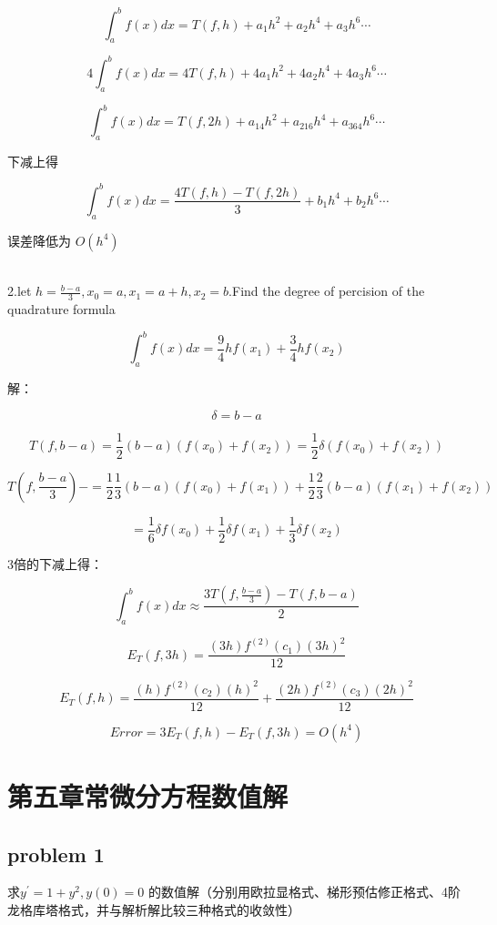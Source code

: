 \documentclass[UTF8]{ctexart}
\begin{document}
$$
\int_{a}^{b} f(x) dx=T(f,h)+a_1h^2+a_2h^4+a_3h^6\cdots
$$

$$
4\int_{a}^{b} f(x) dx=4T(f,h)+4a_1h^2+4a_2h^4+4a_3h^6\cdots
$$

$$
\int_{a}^{b} f(x) dx=T(f,2h)+a_14h^2+a_216h^4+a_364h^6\cdots
$$


下减上得

$$
\int_{a}^{b} f(x) dx=\frac{4T(f,h)-T(f,2h)}{3}+b_1h^4+b_2h^6\cdots
$$

误差降低为 $O(h^4)$


~\\
2.let $ h= \frac{b-a}{3} , x_0=a,x_1=a+h,x_2=b$.Find the degree of percision of the quadrature formula


$$\int_{a}^{b} f(x) dx=\frac{9}{4}hf(x_1)+\frac{3}{4}hf(x_2)$$


解：

$$
\delta =b-a
$$

$$
T(f,b-a)=\frac{1}{2} (b-a) (f(x_0)+f(x_2)) 
= \frac{1}{2} \delta (f(x_0)+f(x_2)) 
$$


$$
T(f,\frac{b-a}{3})-=\frac{1}{2} \frac{1}{3}(b-a) (f(x_0)+f(x_1))  +\frac{1}{2} \frac{2}{3}(b-a) (f(x_1)+f(x_2))
$$

$$
= \frac{1}{6} \delta f(x_0)+ \frac{1}{2} \delta f(x_1) + \frac{1}{3} \delta f(x_2)
$$

3倍的下减上得：


$$
\int_{a}^{b} f(x) dx \approx \frac{3T(f,\frac{b-a}{3})-T(f,b-a)}{2}
$$

$$
E_T (f,3h)=\frac{(3h)f^{(2)}(c_1)(3h)^2}{12}
$$

$$
E_T (f,h)=\frac{(h)f^{(2)}(c_2)(h)^2}{12}+\frac{(2h)f^{(2)}(c_3)(2h)^2}{12}
$$

$$
Error=3E_T (f,h)-E_T (f,3h)=O(h^4)
$$



\newpage


\section{第五章常微分方程数值解}

\subsection{problem 1}
求$ y^{\prime}=1+y^{2}, y(0)=0$ 的数值解（分别用欧拉显格式、梯形预估修正格式、4阶龙格库塔格式，并与解析解比较三种格式的收敛性）
\end{document}
